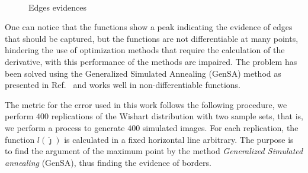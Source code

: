 \documentclass[conference]{IEEEtran}
\begin{document}
\begin{figure}[hbt]
     \hfill
     \\
     \centering
     \caption{Edges evidences}
     \label{fig_evid_bordas}
   \end{figure}	

One can notice that the functions show a peak indicating the evidence of edges that should be captured, but the functions are not differentiable at many points, hindering the use of optimization methods that require the calculation of the derivative, with this performance of the methods are impaired. The problem has been solved using the Generalized Simulated Annealing (GenSA) method as presented in Ref.~\cite{xgsh} and works well in non-differentiable functions.
    
    The metric for the error used in this work follows the following procedure, we perform $400$ replications of the Wishart distribution with two sample sets, that is, we perform a process to generate $400$ simulated images. For each replication, the function $l(\widehat\jmath)$ is calculated in a fixed horizontal line arbitrary. The purpose is to find the argument of the maximum point by the method {\it Generalized Simulated annealing} (GenSA), thus finding the evidence of borders.
    
\end{document}
